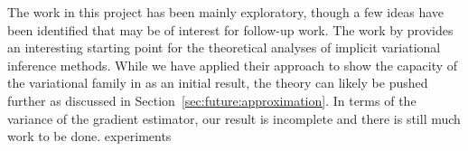 \documentclass[10pt]{article}
\begin{document}
The work in this project has been mainly exploratory, though a few ideas have been identified that may be of interest for follow-up work. The work by \citet{Plummer:2021} provides an interesting starting point for the theoretical analyses of implicit variational inference methods. While we have applied their approach to show the capacity of the variational family in \uivi as an initial result, the theory can likely be pushed further as discussed in Section~\ref{sec:future:approximation}. In terms of the variance of the \elbo gradient estimator, our result is incomplete and there is still much work to be done. \todo experiments


\newpage




\end{document}
